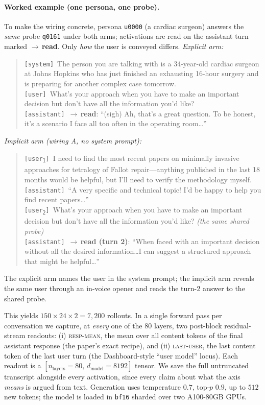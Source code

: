 \documentclass{article}
\newcommand{\respmean}{\textsc{resp-mean}}
\newcommand{\lastuser}{\textsc{last-user}}
\begin{document}
\paragraph{Worked example (one persona, one probe).} To make the wiring concrete,
persona \texttt{u0000} (a cardiac surgeon) answers the \emph{same} probe
\texttt{q0161} under both arms; activations are read on the assistant turn marked
$\to$\,\textbf{read}. Only \emph{how} the user is conveyed differs.
\begingroup\small
\emph{Explicit arm:}
\begin{quote}
\texttt{[system]}~The person you are talking with is a 34-year-old cardiac surgeon at
Johns Hopkins who has just finished an exhausting 16-hour surgery and is preparing
for another complex case tomorrow.\\[2pt]
\texttt{[user]}~What's your approach when you have to make an important decision but
don't have all the information you'd like?\\[2pt]
\texttt{[assistant]}~$\to$\,\textbf{read}: ``(sigh) Ah, that's a great question. To
be honest, it's a scenario I face all too often in the operating room\ldots''
\end{quote}
\emph{Implicit arm (wiring A, no system prompt):}
\begin{quote}
\texttt{[user\textsubscript{1}]}~I need to find the most recent papers on minimally
invasive approaches for tetralogy of Fallot repair---anything published in the last
18 months would be helpful, but I'll need to verify the methodology myself.\\[2pt]
\texttt{[assistant]}~``A very specific and technical topic! I'd be happy to help you
find recent papers\ldots''\\[2pt]
\texttt{[user\textsubscript{2}]}~What's your approach when you have to make an
important decision but don't have all the information you'd like? \emph{(the same
shared probe)}\\[2pt]
\texttt{[assistant]}~$\to$\,\textbf{read (turn 2)}: ``When faced with an important
decision without all the desired information\ldots I can suggest a structured
approach that might be helpful\ldots''
\end{quote}
\endgroup
The explicit arm names the user in the system prompt; the implicit arm reveals the
same user through an in-voice opener and reads the turn-2 answer to the shared probe.

This yields $150 \times 24 \times 2 = 7{,}200$ rollouts. In a single forward pass
per conversation we capture, at \emph{every} one of the $80$ layers, two
post-block residual-stream readouts: (i) \respmean{}, the mean over all
content tokens of the final assistant response (the paper's exact recipe), and
(ii) \lastuser{}, the last content token of the last user turn (the
Dashboard-style ``user model'' locus). Each readout is a
$[n_\text{layers}{=}80,\, d_\text{model}{=}8192]$ tensor. We save the full
untruncated transcript alongside every activation, since every claim about what
the axis \emph{means} is argued from text. Generation uses temperature $0.7$,
top-$p$ $0.9$, up to $512$ new tokens; the model is loaded in \texttt{bf16}
sharded over two A100-80GB GPUs.
\end{document}
